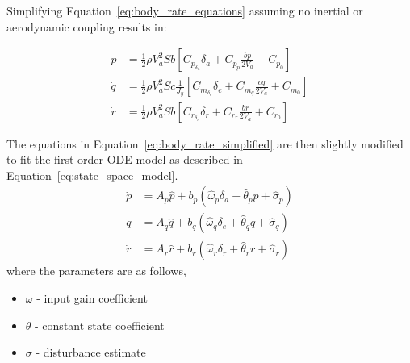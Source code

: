Simplifying Equation~\ref{eq:body_rate_equations} assuming no inertial or aerodynamic coupling results in:

\begin{equation}\label{eq:body_rate_simplified}
\begin{split}
 \dot{p}&=\frac{1}{2}\rho V_a^2Sb\left[C_{p_{\delta_a}}\delta_a+C_{p_p}\frac{bp}{2V_a}+C_{p_0}\right]\\
 \dot{q}&=\frac{1}{2}\rho V_a^2Sc\frac{1}{J_y}\left[C_{m_{\delta_e}}\delta_e+C_{m_q}\frac{cq}{2V_a}+C_{m_0}\right]\\
 \dot{r}&=\frac{1}{2}\rho V_a^2Sb\left[C_{r_{\delta_r}}\delta_r+C_{r_r}\frac{br}{2V_a}+C_{r_0}\right]
\end{split} 
\end{equation}

The equations in Equation~\ref{eq:body_rate_simplified} are then slightly modified to fit the first order \ac{ODE} model as described in Equation~\ref{eq:state_space_model}.
\begin{equation}\label{eq:simplified_ac_model}
\begin{split}
\dot{p}&=A_p\hat{p}+b_p\left(\hat{\omega}_p\delta_a+\hat{\theta}_pp+\hat{\sigma}_p\right)\\
\dot{q}&=A_q\hat{q}+b_q\left(\hat{\omega}_q\delta_e+\hat{\theta}_qq+\hat{\sigma}_q\right)\\
\dot{r}&=A_r\hat{r}+b_r\left(\hat{\omega}_r\delta_r+\hat{\theta}_rr+\hat{\sigma}_r\right)
\end{split}
\end{equation}
where the parameters are as follows,
\begin{itemize}
 \item[] $\omega$ - input gain coefficient
 \item[] $\theta$ - constant state coefficient
 \item[] $\sigma$ - disturbance estimate
\end{itemize}

